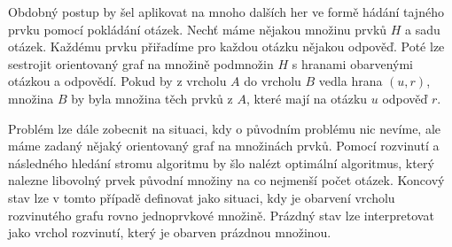 Obdobný postup by šel aplikovat na mnoho dalších her ve formě hádání tajného prvku pomocí pokládání otázek. Nechť máme nějakou množinu prvků $H$ a sadu otázek. Každému prvku přiřadíme pro každou otázku nějakou odpověď. Poté lze sestrojit orientovaný graf na množině podmnožin $H$ s hranami obarvenými otázkou a odpovědí. Pokud by z vrcholu $A$ do vrcholu $B$ vedla hrana $(u,r)$, množina $B$ by byla množina těch prvků z $A$, které mají na otázku $u$ odpověď $r$. 

Problém lze dále zobecnit na situaci, kdy o původním problému nic nevíme, ale máme zadaný nějaký orientovaný graf na množinách prvků. Pomocí rozvinutí a následného hledání stromu algoritmu by šlo nalézt optimální algoritmus, který nalezne libovolný prvek původní množiny na co nejmenší počet otázek. Koncový stav lze v tomto případě definovat jako situaci, kdy je obarvení vrcholu rozvinutého grafu rovno jednoprvkové množině. Prázdný stav lze interpretovat jako vrchol rozvinutí, který je obarven prázdnou množinou. 









